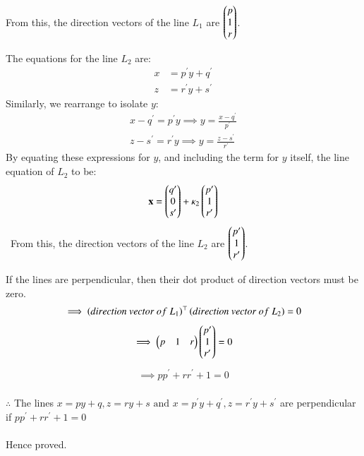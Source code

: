 \documentclass[journal]{IEEEtran}
\begin{document}
From this, the direction vectors of the line $L_1$ are $\myvec{p\\1\\r}$.

The equations for the line $L_2$ are:
\begin{align}
    x &= p^{\prime}y + q^{\prime} \\
    z &= r^{\prime}y + s^{\prime}
\end{align}
Similarly, we rearrange to isolate $y$:
\begin{align}
    x - q^{\prime} = p^{\prime}y \implies y = \frac{x-q^{\prime}}{p^{\prime}} \\
    z - s^{\prime} = r^{\prime}y \implies y = \frac{z-s^{\prime}}{r^{\prime}}
\end{align}
By equating these expressions for $y$, and including the term for $y$ itself, the line equation of $L_2$ to be:
\begin{align}
	\vec{x} = \myvec{q^{\prime}\\ 0 \\ s^{\prime}} + \kappa_2 \myvec{p^{\prime} \\ 1 \\ r^{\prime}}
\end{align}\
From this, the direction vectors of the line $L_2$ are $\myvec{p^{\prime}\\1\\r^{\prime}}$.\\
\bigskip

If the lines are perpendicular, then their dot product of direction vectors must be zero.
\begin{align}
    \implies \brak{direction\ vector\ of\ L_1}^\top\brak{direction\ vector\ of\ L_2} = 0
\end{align}
\begin{align}
\implies \myvec{p & 1 & r} \myvec{p^{\prime}\\1\\r^{\prime}} = 0
\end{align}
\begin{align}
\implies pp^{\prime}+rr^{\prime}+1=0
\end{align}\\
\bigskip
$\therefore$ The lines $x=py+q , z=ry+s \text{ and } x=p^{\prime}y+q^{\prime}, z=r^{\prime}y+s^{\prime} $ are perpendicular if $pp^{\prime}+rr^{\prime}+1=0$\\
\\
Hence proved.
\end{document}
